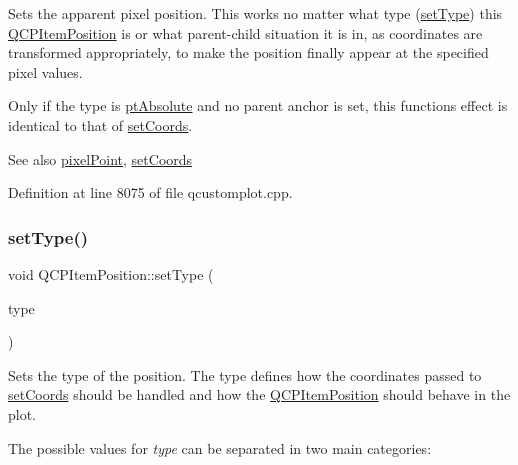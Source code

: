 Sets the apparent pixel position. This works no matter what type (\hyperlink{class_q_c_p_item_position_aa476abf71ed8fa4c537457ebb1a754ad}{set\+Type}) this \hyperlink{class_q_c_p_item_position}{Q\+C\+P\+Item\+Position} is or what parent-\/child situation it is in, as coordinates are transformed appropriately, to make the position finally appear at the specified pixel values.

Only if the type is \hyperlink{class_q_c_p_item_position_aad9936c22bf43e3d358552f6e86dbdc8a564f5e53e550ead1ec5fc7fc7d0b73e0}{pt\+Absolute} and no parent anchor is set, this function\textquotesingle{}s effect is identical to that of \hyperlink{class_q_c_p_item_position_aa988ba4e87ab684c9021017dcaba945f}{set\+Coords}.

\begin{DoxySeeAlso}{See also}
\hyperlink{class_q_c_p_item_position_a6cad070c22801295231f5bd6045afe70}{pixel\+Point}, \hyperlink{class_q_c_p_item_position_aa988ba4e87ab684c9021017dcaba945f}{set\+Coords} 
\end{DoxySeeAlso}


Definition at line 8075 of file qcustomplot.\+cpp.

\mbox{\label{class_q_c_p_item_position_aa476abf71ed8fa4c537457ebb1a754ad}} 
\subsubsection{\texorpdfstring{set\+Type()}{setType()}}
{\footnotesize\ttfamily void Q\+C\+P\+Item\+Position\+::set\+Type (\begin{DoxyParamCaption}\item[{\hyperlink{class_q_c_p_item_position_aad9936c22bf43e3d358552f6e86dbdc8}{Q\+C\+P\+Item\+Position\+::\+Position\+Type}}]{type }\end{DoxyParamCaption})}

Sets the type of the position. The type defines how the coordinates passed to \hyperlink{class_q_c_p_item_position_aa988ba4e87ab684c9021017dcaba945f}{set\+Coords} should be handled and how the \hyperlink{class_q_c_p_item_position}{Q\+C\+P\+Item\+Position} should behave in the plot.

The possible values for {\itshape type} can be separated in two main categories\+:

